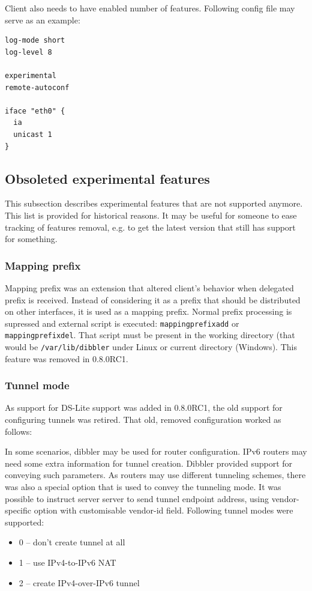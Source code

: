 Client also needs to have enabled number of features. Following config
file may serve as an example:

\begin{lstlisting}
log-mode short
log-level 8

experimental
remote-autoconf

iface "eth0" {
  ia
  unicast 1
}
\end{lstlisting}

\subsection{Obsoleted experimental features}
This subsection describes experimental features that are not supported
anymore. This list is provided for historical reasons. It may be
useful for someone to ease tracking of features removal, e.g. to 
get the latest version that still has support for something.

\subsubsection{Mapping prefix}
Mapping prefix was an extension that altered client's behavior when 
delegated prefix is received. Instead of considering it as a prefix 
that should be distributed on other interfaces, it is used as a mapping
prefix. Normal prefix processing is supressed and external script is
executed: \verb+mappingprefixadd+ or \verb+mappingprefixdel+. That
script must be present in the working directory (that would be
\verb+/var/lib/dibbler+ under Linux or current directory (Windows).
This feature was removed in 0.8.0RC1.

\subsubsection{Tunnel mode}
As support for DS-Lite \cite{draft-ds-lite} support was added in
0.8.0RC1, the old support for configuring tunnels was retired. That
old, removed configuration worked as follows:

In some scenarios, dibbler may be used for router configuration. IPv6
routers may need some extra information for tunnel creation. Dibbler
provided support for conveying such parameters. As routers may use
different tunneling schemes, there was also a special option that is 
used to convey the tunneling mode. It was possible to instruct server
server to send tunnel endpoint address, using vendor-specific option 
with customisable vendor-id field. Following tunnel modes were 
supported:

\begin{itemize}
\item 0 -- don't create tunnel at all
\item 1 -- use IPv4-to-IPv6 NAT
\item 2 -- create IPv4-over-IPv6 tunnel
\end{itemize}

